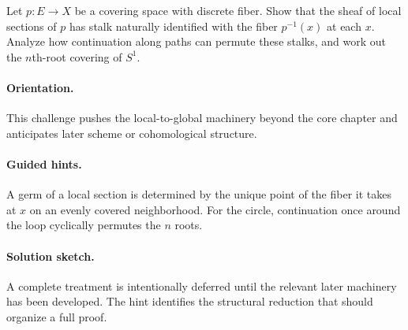 \begin{problem}
Let $p:E\to X$ be a covering space with discrete fiber. Show that the sheaf of local sections of $p$ has stalk naturally identified with the fiber $p^{-1}(x)$ at each $x$. Analyze how continuation along paths can permute these stalks, and work out the $n$th-root covering of $S^1$.
\end{problem}

\ifdefined\FullProblemDossiers
\paragraph{Orientation.}
This challenge pushes the local-to-global machinery beyond the core chapter and anticipates later scheme or cohomological structure.

\paragraph{Guided hints.}
A germ of a local section is determined by the unique point of the fiber it takes at $x$ on an evenly covered neighborhood. For the circle, continuation once around the loop cyclically permutes the $n$ roots.

\paragraph{Solution sketch.}
A complete treatment is intentionally deferred until the relevant later machinery has been developed. The hint identifies the structural reduction that should organize a full proof.
\fi
